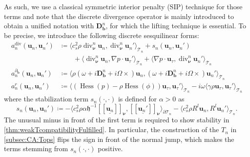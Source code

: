 \documentclass{m2an}
\newcommand{\inner}[1]{\langle #1 \rangle}
\newcommand{\csr}{c_s^2 \rho}
\newcommand{\nv}{\boldsymbol{\nu}}
\newcommand{\bflow}{\mathbf{b}}
\newcommand{\angvel}{\Omega}
\newcommand{\dopd}{(\omega+i\ddiffb+i\angvel\times)}
\renewcommand{\u}{\mathbf{u}}
\renewcommand{\div}{\operatorname{div}}
\DeclareMathOperator{\hess}{Hess}
\newcommand{\calT}{\mathcal{T}}
\newcommand{\Xn}{\mathbb{X}_n}
\newcommand{\bD}{\mathbf{D}}
\newcommand{\hdgjump}[1]{[\![\underline{#1} ]\!]}
\newcommand{\Tn}{\calT_n}
\newcommand{\spl}{\langle}
\newcommand{\spr}{\rangle}
\newcommand{\diffb}{\partial_{\bflow}}
\newcommand{\ddiffb}{\bD_{\bflow}^n}
\newcommand{\ddiv}{\div_{\nv}^n}
\newcommand{\h}{\mathfrak{h}}
\newcommand{\adivn}{\hyperref[eq:an:components:adivn]{a^{\div}_n}}
\newcommand{\aconvn}{\hyperref[eq:an:components:aconvn]{a^{\diffb}_n}}
\newcommand{\aremn}{\hyperref[eq:an:components:aremn]{a^{r}_n}}
\theoremstyle{plain}
\theoremstyle{definition}
\begin{document}
As such, we use a classical symmetric interior penalty (SIP) technique for those terms and note that the discrete divergence operator is mainly introduced to obtain a unified notation with $\ddiffb$, for which the lifting technique is essential.
To be precise, we introduce the following discrete sesquilinear forms: 
\begin{subequations}\label{eq:an:components}
   \begin{align}
      \adivn(\u_n,\u_n') &\coloneqq \inner{\csr \ddiv \u_n, \ddiv \u_n'}_{\Tn} +  s_n(\u_n,\u_n') \label{eq:an:components:adivn}\\
      &\qquad + \inner{\ddiv \u_n, \nabla p \cdot \u_{\tau}'}_{\Tn} + \inner{\nabla p \cdot \u_{\tau}, \ddiv \u_n'}_{\Tn} \nonumber \\ 
      \aconvn(\u_n,\u_n') &\coloneqq \inner{\rho \dopd \u_n, \dopd \u_n'}_{\Tn}\label{eq:an:components:aconvn}\\
      \aremn(\u_n,\u_n') &\coloneqq \inner{ (\hess(p) - \rho \hess(\phi)) \u_{\tau}, \u_{\tau}'}_{\Tn} - i \omega \inner{ \gamma \rho \u_{\tau}, \u_{\tau}'}_{\Tn}
      \label{eq:an:components:aremn}
   \end{align}
\end{subequations}
where the stabilization term $s_n(\cdot,\cdot)$ is defined for $\alpha > 0$ as
\begin{equation*}
   s_n(\u_n,\u_n') \coloneqq -\spl c_s^2 \rho \alpha \h^{-1} \hdgjump{\u_n}_{\nv}, \hdgjump{\u_n'}_{\nv} \spr_{\partial \Tn} - \spl c_s^2 \rho R^l \u_n, R^l \u_n' \spr_{\Tn}.
\end{equation*}
The unusual minus in front of the first term is required to show stability in \cref{thm:weakTcompatibilityFulfilled}. In particular, the construction of the $T_n$ in \cref{subsec:CA:Tops} flips the sign in front of the normal jump, which makes the terms stemming from $s_n(\cdot,\cdot)$ positive.
\end{document}
